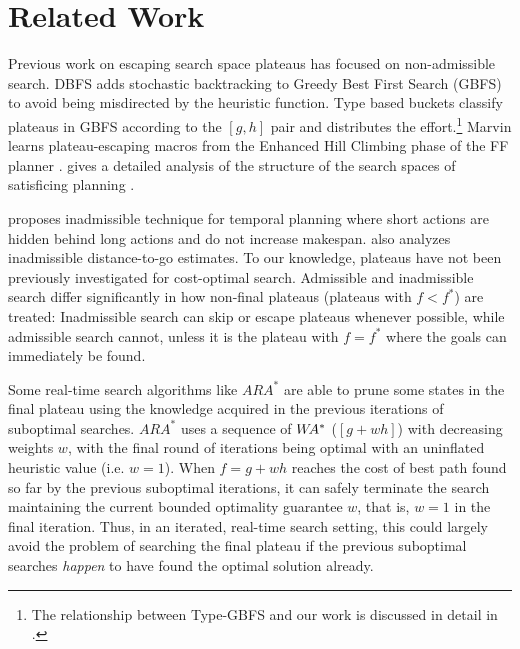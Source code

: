 
\section{Related Work}

Previous work on escaping search space plateaus has focused on
non-admissible search.  DBFS \cite{imai2011novel} %
adds stochastic backtracking to Greedy Best First Search (GBFS) to avoid
being misdirected by the heuristic function. Type based buckets
\cite{xie14type} classify plateaus in GBFS according to the
$[g,h]$ pair and distributes the effort.\footnote{The relationship between Type-GBFS and our work is discussed in detail in .}  Marvin \cite{Coles07} learns plateau-escaping macros
from the Enhanced Hill Climbing phase of the FF planner
\cite{Hoffmann01}. %
\citeauthor{Hoffmann05}  gives a detailed analysis of the
structure of the search spaces of satisficing planning \citeyear{Hoffmann05,Hoffmann11}.

 \citeauthor{benton2010g} \citeyear{benton2010g} proposes inadmissible technique for temporal planning
 where short actions are hidden behind long actions and do not increase makespan.
 \citeauthor{wilt2011cost} \citeyear{wilt2011cost} also analyzes inadmissible distance-to-go estimates.
% 
To our knowledge, plateaus have not been previously investigated for cost-optimal search.
Admissible and inadmissible search differ significantly in how non-final plateaus (plateaus with $f < f^*$) are treated:
Inadmissible search can skip or escape plateaus whenever possible, while
admissible search cannot, unless it is the plateau with $f=f^*$ where the goals can immediately be found.

Some real-time search algorithms like $ARA^*$ \cite{likhachev2008anytime} are able to prune some states in the final plateau using the knowledge acquired in the previous iterations of suboptimal searches. $ARA^*$ uses a sequence of $W\hspace{-0.2em}A^*$ ($[g+wh]$) with decreasing weights $w$, with the final round of iterations being optimal \astar with an uninflated heuristic value (i.e. $w=1$). When $f=g+wh$ reaches the cost of best path found so far by the previous suboptimal iterations, it can safely terminate the search maintaining the current bounded optimality guarantee $w$, that is, $w=1$ in the final iteration. Thus, in an iterated, real-time search setting, this could largely avoid the problem of searching the final plateau if the previous suboptimal searches \emph{happen} to have found the optimal solution already. 

